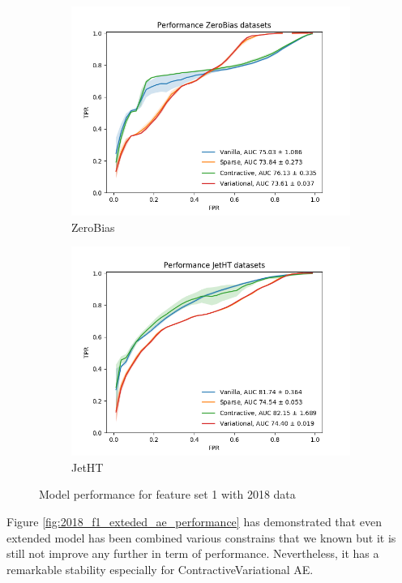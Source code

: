 \begin{figure}[h!]
\begin{subfigure}[b]{0.49\linewidth}
        \includegraphics[width=\linewidth]{images/reco/2018/feature_1/performance_ZeroBias_VanillaSparseContractiveVariational.png}
        \caption{ZeroBias}
    \end{subfigure}
    \begin{subfigure}[b]{0.49\linewidth}
        \includegraphics[width=\linewidth]{images/reco/2018/feature_1/performance_JetHT_VanillaSparseContractiveVariational.png}
        \caption{JetHT}
    \end{subfigure}
    \caption{Model performance for feature set 1 with 2018 data}
\label{fig:2018_f1_ae_performance}
\end{figure}

Figure \ref{fig:2018_f1_exteded_ae_performance} has demonstrated that even extended model has been combined various constrains that we known but it is still not improve any further in term of performance. Nevertheless, it has a remarkable stability especially for ContractiveVariational AE.

